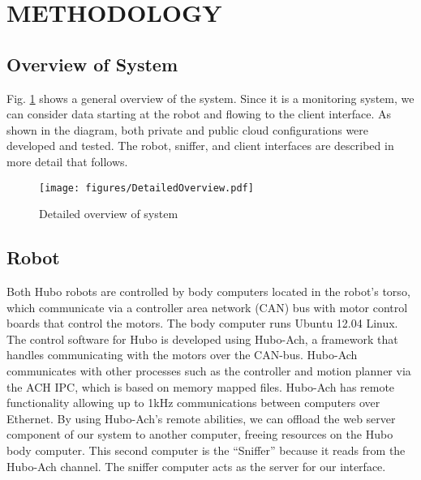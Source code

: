\documentclass[letterpaper, 10 pt, conference]{ieee/ieeeconf}  %
\begin{document}
\section{METHODOLOGY}

\subsection{Overview of System}

Fig. \ref{fig:Overview} shows a general overview of the system.
Since it is a monitoring system, we can consider data starting at the robot and flowing to the client interface.
As shown in the diagram, both private and public cloud configurations were developed and tested.
The robot, sniffer, and client interfaces are described in more detail that follows.

\begin{figure}[thpb]
  \centering
  \texttt{[image: figures/DetailedOverview.pdf]}
  \caption{Detailed overview of system}
  \label{fig:Overview}
\end{figure}

\subsection{Robot}

Both Hubo robots are controlled by body computers located in the robot's torso, which communicate via a controller area network (CAN) bus with motor control boards that control the motors.
The body computer runs Ubuntu 12.04 Linux.
The control software for Hubo is developed using Hubo-Ach, a framework that handles communicating with the motors over the CAN-bus.\cite{lofaro2013unified}
Hubo-Ach communicates with other processes such as the controller and motion planner via the ACH IPC, which is based on memory mapped files.\cite{dantam2012robust}
Hubo-Ach has remote functionality allowing up to 1kHz communications between computers over Ethernet.
By using Hubo-Ach's remote abilities, we can offload the web server component of our system to another computer, freeing resources on the Hubo body computer.
This second computer is the ``Sniffer'' because it reads from the Hubo-Ach channel.
The sniffer computer acts as the server for our interface.
\end{document}
